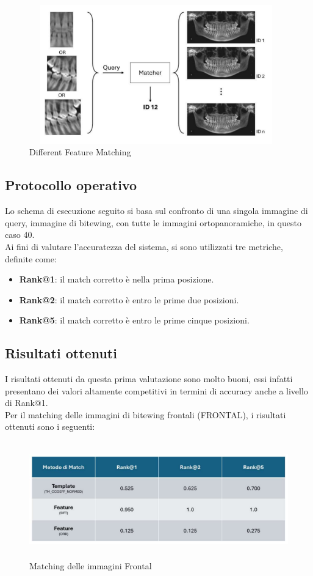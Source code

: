 \documentclass[12pt,a4paper,openright,twoside]{book}
\begin{document}
\begin{figure}[H]
	\centering
	\includegraphics[height=6cm,width=11cm]{figures/matchprof.pdf}
    	\caption{Different Feature Matching}
	\label{fig:featurematching}
\end{figure}

\subsection{Protocollo operativo}
Lo schema di esecuzione seguito si basa sul confronto di una singola immagine di query, immagine di bitewing, con tutte le immagini ortopanoramiche, in questo caso 40.\\
Ai fini di valutare l'accuratezza del sistema, si sono utilizzati tre metriche, definite come:
\begin{itemize}
\item \textbf{Rank@1}: il match corretto è nella prima posizione.
\item \textbf{Rank@2}: il match corretto è entro le prime due posizioni.
\item \textbf{Rank@5}: il match corretto è entro le prime cinque posizioni.
\end{itemize}

\subsection{Risultati ottenuti}
I risultati ottenuti da questa prima valutazione sono molto buoni, essi infatti presentano dei valori altamente competitivi in termini di accuracy anche a livello di Rank@1.\\
Per il matching delle immagini di bitewing frontali (FRONTAL), i risultati ottenuti sono i seguenti:

\begin{figure}[H]
	\centering
	\includegraphics[height=5cm,width=15cm]{figures/frontalprof.pdf}
    	\caption{Matching delle immagini Frontal}
	\label{fig:frontalprof}
\end{figure}
\end{document}
